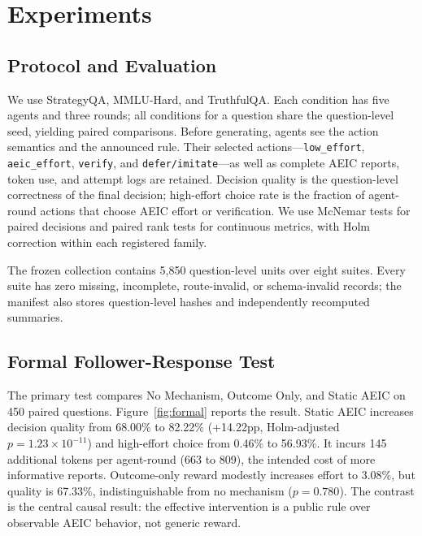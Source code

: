 \section{Experiments}
\label{sec:exp}

\subsection{Protocol and Evaluation}

We use StrategyQA, MMLU-Hard, and TruthfulQA.  Each condition has five agents and three rounds; all conditions for a question share the question-level seed, yielding paired comparisons.  Before generating, agents see the action semantics and the announced rule.  Their selected actions---\texttt{low\_effort}, \texttt{aeic\_effort}, \texttt{verify}, and \texttt{defer/imitate}---as well as complete AEIC reports, token use, and attempt logs are retained.  Decision quality is the question-level correctness of the final decision; high-effort choice rate is the fraction of agent-round actions that choose AEIC effort or verification.  We use McNemar tests for paired decisions and paired rank tests for continuous metrics, with Holm correction within each registered family.

The frozen collection contains 5,850 question-level units over eight suites.  Every suite has zero missing, incomplete, route-invalid, or schema-invalid records; the manifest also stores question-level hashes and independently recomputed summaries.

\subsection{Formal Follower-Response Test}

The primary test compares No Mechanism, Outcome Only, and Static AEIC on 450 paired questions.  Figure~\ref{fig:formal} reports the result.  Static AEIC increases decision quality from 68.00\% to 82.22\% (+14.22pp, Holm-adjusted $p=1.23\times10^{-11}$) and high-effort choice from 0.46\% to 56.93\%.  It incurs 145 additional tokens per agent-round (663 to 809), the intended cost of more informative reports.  Outcome-only reward modestly increases effort to 3.08\%, but quality is 67.33\%, indistinguishable from no mechanism ($p=0.780$).  The contrast is the central causal result: the effective intervention is a public rule over observable AEIC behavior, not generic reward.

